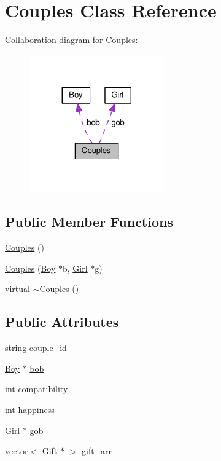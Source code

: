 \hypertarget{class_couples}{\section{Couples Class Reference}
\label{class_couples}
}


Collaboration diagram for Couples\-:
\nopagebreak
\begin{figure}[H]
\begin{center}
\leavevmode
\includegraphics[width=164pt]{class_couples__coll__graph}
\end{center}
\end{figure}
\subsection*{Public Member Functions}
\begin{DoxyCompactItemize}
\item 
\hyperlink{class_couples_a8e44a5113c6bcf52fc2f20733ae9d172}{Couples} ()
\item 
\hyperlink{class_couples_ad73efc4ce125b8dee3686d467ccebb17}{Couples} (\hyperlink{class_boy}{Boy} $\ast$b, \hyperlink{class_girl}{Girl} $\ast$g)
\item 
virtual \hyperlink{class_couples_aa1c64491e8118dc3dff84fbc99b289cd}{$\sim$\-Couples} ()
\end{DoxyCompactItemize}
\subsection*{Public Attributes}
\begin{DoxyCompactItemize}
\item 
string \hyperlink{class_couples_a7391cf4c54dc2da720263f2b066167d0}{couple\-\_\-id}
\item 
\hyperlink{class_boy}{Boy} $\ast$ \hyperlink{class_couples_a958e30179ae954b9a661189bf3fb0ba2}{bob}
\item 
int \hyperlink{class_couples_aaa4242b0d809e3a5688e9ad88ba15d52}{compatibility}
\item 
int \hyperlink{class_couples_a09ea2aef16ac6fb58055d3e39060e2ce}{happiness}
\item 
\hyperlink{class_girl}{Girl} $\ast$ \hyperlink{class_couples_acc2ce9df943ae80302c0fc379dce508d}{gob}
\item 
vector$<$ \hyperlink{class_gift}{Gift} $\ast$ $>$ \hyperlink{class_couples_ae6d39ee74b3832f11546c831e074d821}{gift\-\_\-arr}
\end{DoxyCompactItemize}


